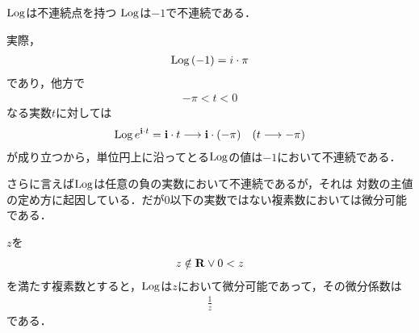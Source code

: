 	\begin{itembox}[l]{$\operatorname{Log}$は不連続点を持つ}
		$\operatorname{Log}$は$-1$で不連続である．
	\end{itembox}
	
	実際，
	\begin{align}
		\operatorname{Log}{(-1)} = i \cdot \pi
	\end{align}
	であり，他方で
	\begin{align}
		-\pi < t < 0
	\end{align}
	なる実数$t$に対しては
	\begin{align}
		\operatorname{Log}{e^{\mathbf{i} \cdot t}} = \mathbf{i} \cdot t
		\longrightarrow \mathbf{i} \cdot (-\pi)
		\quad (t \longrightarrow -\pi)
	\end{align}
	が成り立つから，単位円上に沿ってとる$\operatorname{Log}$の値は$-1$において不連続である．
	
	さらに言えば$\operatorname{Log}$は任意の負の実数において不連続であるが，それは
	対数の主値の定め方に起因している．だが$0$以下の実数ではない複素数においては微分可能である．
	
	\begin{screen}
		\begin{thm}
		\label{thm:pv_log_is_holomorphic}
			$z$を
			\begin{align}
				z \notin \mathbf{R} \vee 0 < z
			\end{align}
			を満たす複素数とすると，$\operatorname{Log}$は$z$において微分可能であって，その微分係数は
			\begin{align}
				\frac{1}{z}
			\end{align}
			である．
		\end{thm}
	\end{screen}
	
